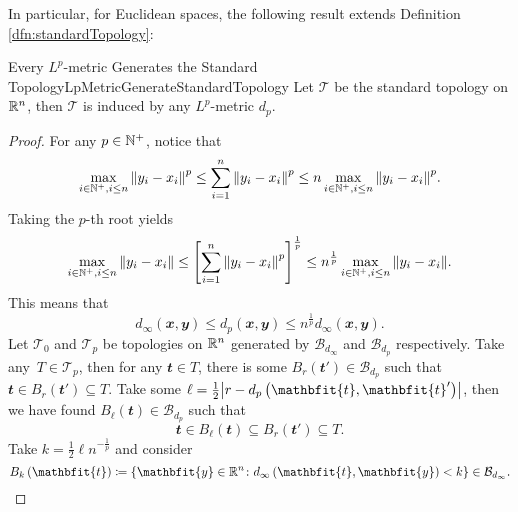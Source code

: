 \documentclass[math]{amznotes}
\theoremstyle{remark}
\begin{document}
In particular, for Euclidean spaces, the following result extends Definition \ref{dfn:standardTopology}:
\begin{probox}{Every $L^p$-metric Generates the Standard Topology}{LpMetricGenerateStandardTopology}
    Let $\mathcal{T}$ be the standard topology on $\mathbb{R}^n$, then $\mathcal{T}$ is induced by any $L^p$-metric $d_p$.
    \tcblower
    \begin{proof}
        For any $p \in \mathbb{N}^+$, notice that 
        \begin{equation*}
            \max_{i \in \mathbb{N}^+, i \leq n}{\left\lVert {y_i - x_i} \right\rVert}^p \leq \sum_{i = 1}^{n}{\left\lVert {y_i - x_i} \right\rVert}^p \leq n\max_{i \in \mathbb{N}^+, i \leq n}{\left\lVert {y_i - x_i} \right\rVert}^p.
        \end{equation*}
        Taking the $p$-th root yields
        \begin{equation*}
            \max_{i \in \mathbb{N}^+, i \leq n}{\left\lVert {y_i - x_i} \right\rVert} \leq \left[\sum_{i = 1}^{n}{\left\lVert {y_i - x_i} \right\rVert}^p\right]^{\frac{1}{p}} \leq n^{\frac{1}{p}}\max_{i \in \mathbb{N}^+, i \leq n}{\left\lVert {y_i - x_i} \right\rVert}.
        \end{equation*}
        This means that 
        \begin{equation*}
            d_{\infty}\left(\mathbfit{x}, \mathbfit{y}\right) \leq d_p\left(\mathbfit{x}, \mathbfit{y}\right) \leq n^{\frac{1}{p}}d_{\infty}\left(\mathbfit{x}, \mathbfit{y}\right).
        \end{equation*}
        Let $\mathcal{T}_0$ and $\mathcal{T}_p$ be topologies on $\mathbb{R}^n$ generated by $\mathcal{B}_{d_{\infty}}$ and $\mathcal{B}_{d_p}$ respectively. Take any~$T \in \mathcal{T}_p$, then for any $\mathbfit{t} \in T$, there is some $B_{r}\left(\mathbfit{t}'\right) \in \mathcal{B}_{d_{p}}$ such that~$\mathbfit{t} \in B_{r}\left(\mathbfit{t}'\right) \subseteq T$. Take some $\ell = \frac{1}{2}\abs{r - d_p\left(\mathbfit{t}, \mathbfit{t}'\right)}$, then we have found $B_{\ell}\left(\mathbfit{t}\right) \in \mathcal{B}_{d_p}$ such that 
        \begin{equation*}
            \mathbfit{t} \in B_{\ell}\left(\mathbfit{t}\right) \subseteq B_{r}\left(\mathbfit{t}'\right) \subseteq T.
        \end{equation*}
        Take $k = \frac{1}{2}\ell n^{-\frac{1}{p}}$ and consider 
        \begin{equation*}
            B_{k}\left(\mathbfit{t}\right) \coloneqq \left\{\mathbfit{y} \in \R^n \colon d_{\infty}\left(\mathbfit{t}, \mathbfit{y}\right) < k\right\} \in \mathcal{B}_{d_{\infty}}.
        \end{equation*}

\end{proof}
\end{probox}
\end{document}
